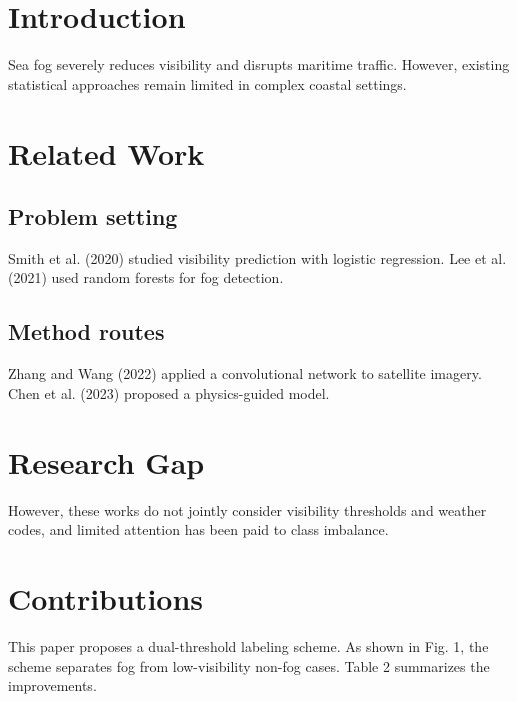 \documentclass{article}
\begin{document}
\section{Introduction}
Sea fog severely reduces visibility and disrupts maritime traffic. However, existing
statistical approaches remain limited in complex coastal settings.

\section{Related Work}
\subsection{Problem setting}
Smith et al. (2020) studied visibility prediction with logistic regression.
Lee et al. (2021) used random forests for fog detection.
\subsection{Method routes}
Zhang and Wang (2022) applied a convolutional network to satellite imagery.
Chen et al. (2023) proposed a physics-guided model.

\section{Research Gap}
However, these works do not jointly consider visibility thresholds and weather codes,
and limited attention has been paid to class imbalance.

\section{Contributions}
This paper proposes a dual-threshold labeling scheme. As shown in Fig. 1, the scheme
separates fog from low-visibility non-fog cases. Table 2 summarizes the improvements.



\end{document}
